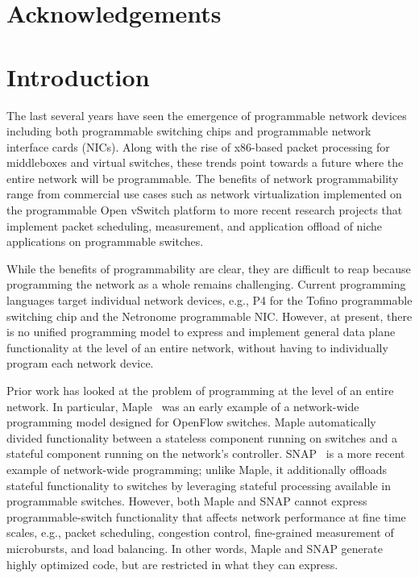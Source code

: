 \documentclass[12pt, oneside]{article}
\begin{document}
\newpage
\section*{Acknowledgements}

\newpage
\tableofcontents

\newpage
\listoffigures

\newpage
\lstlistoflistings

\newpage
\section{Introduction}
The last several years have seen the emergence of programmable network devices
including both programmable switching chips and programmable network interface
cards (NICs). Along with the rise of x86-based packet processing for
middleboxes and virtual switches, these trends point towards a future where the
entire network will be programmable. The benefits of network programmability
range from commercial use cases such as network virtualization implemented on
the programmable Open vSwitch platform to more recent research projects that
implement packet scheduling, measurement, and application offload of niche
applications on programmable switches.

While the benefits of programmability are clear, they are difficult to reap
because programming the network as a whole remains challenging. Current
programming languages target individual network devices, e.g., P4 for the
Tofino programmable switching chip and the Netronome programmable NIC. However,
at present, there is no unified programming model to express and implement
general data plane functionality at the level of an entire network, without
having to individually program each network device.

Prior work has looked at the problem of programming at the level of an entire
network. In particular, Maple~\cite{maple} was an early example of a
network-wide programming model designed for OpenFlow switches. Maple
automatically divided functionality between a stateless component running on
switches and a stateful component running on the network's controller.
SNAP~\cite{snap} is a more recent example of network-wide programming; unlike
Maple, it additionally offloads stateful functionality to switches by
leveraging stateful processing available in programmable switches.  However,
both Maple and SNAP cannot express programmable-switch functionality that
affects network performance at fine time scales, e.g., packet scheduling,
congestion control, fine-grained measurement of microbursts, and load
balancing. In other words, Maple and SNAP generate highly optimized code, but
are restricted in what they can express.
\end{document}
